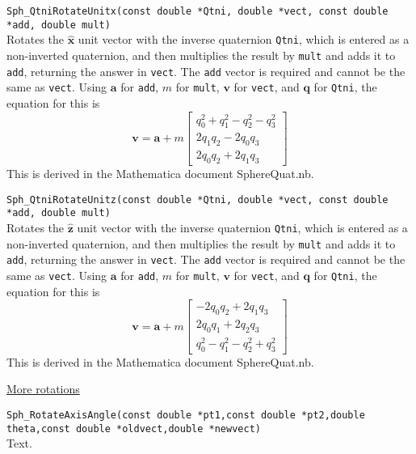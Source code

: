 \documentclass[11pt]{article}
\newcommand {\ttt} {\texttt}
\begin{document}
\begin{description}
\item[\ttt{void}]
\ttt{Sph\_QtniRotateUnitx(const double *Qtni, double *vect, const double *add, double mult)}
\hfill \\
Rotates the $\hat{\bm{x}}$ unit vector with the inverse quaternion \ttt{Qtni}, which is entered as a non-inverted quaternion, and then multiplies the result by \ttt{mult} and adds it to \ttt{add}, returning the answer in \ttt{vect}. The \ttt{add} vector is required and cannot be the same as \ttt{vect}. Using $\bm{a}$ for \ttt{add}, $m$ for \ttt{mult}, $\bm{v}$ for \ttt{vect}, and $\bm{q}$ for \ttt{Qtni}, the equation for this is
$$\bm{v} = \bm{a} + m \left[ \begin{array}{c}
q_0^2 + q_1^2 - q_2^2 - q_3^2 \\
2 q_1 q_2 - 2 q_0 q_3 \\
2 q_0 q_2 + 2 q_1 q_3
\end{array} \right]$$
This is derived in the Mathematica document SphereQuat.nb.


\item[\ttt{void}]
\ttt{Sph\_QtniRotateUnitz(const double *Qtni, double *vect, const double *add, double mult)}
\hfill \\
Rotates the $\hat{\bm{z}}$ unit vector with the inverse quaternion \ttt{Qtni}, which is entered as a non-inverted quaternion, and then multiplies the result by \ttt{mult} and adds it to \ttt{add}, returning the answer in \ttt{vect}. The \ttt{add} vector is required and cannot be the same as \ttt{vect}. Using $\bm{a}$ for \ttt{add}, $m$ for \ttt{mult}, $\bm{v}$ for \ttt{vect}, and $\bm{q}$ for \ttt{Qtni}, the equation for this is
$$\bm{v} = \bm{a} + m \left[ \begin{array}{c}
-2 q_0 q_2 + 2 q_1 q_3 \\
2 q_0 q_1 + 2 q_2 q_3 \\
q_0^2 - q_1^2 - q_2^2 + q_3^2
\end{array} \right]$$
This is derived in the Mathematica document SphereQuat.nb.

\item{\underline{More rotations}}

\item[\ttt{void}]
\ttt{Sph\_RotateAxisAngle(const double *pt1,const double *pt2,double theta,const double *oldvect,double *newvect)}
\hfill \\
Text.



\end{description}
\end{document}
